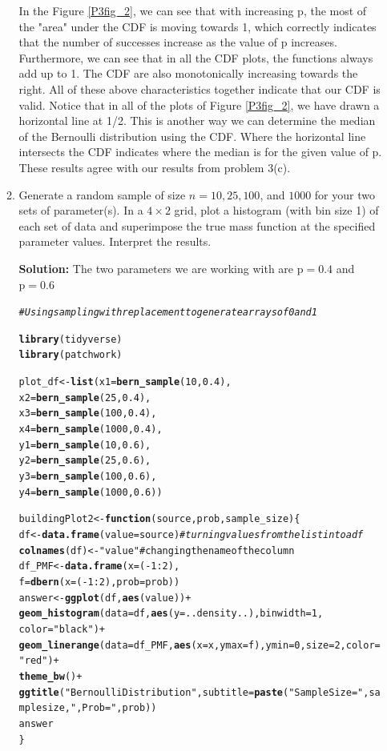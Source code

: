 \documentclass{article}\usepackage[]{graphicx}\usepackage[]{color}
\makeatletter
\newcommand{\hlstr}[1]{\textcolor[rgb]{0.192,0.494,0.8}{#1}}%
\newcommand{\hlcom}[1]{\textcolor[rgb]{0.678,0.584,0.686}{\textit{#1}}}%
\newcommand{\hlkwd}[1]{\textcolor[rgb]{0.737,0.353,0.396}{\textbf{#1}}}%
\newenvironment{kframe}{%
 \def\at@end@of@kframe{}%
 \ifinner\ifhmode%
  \def\at@end@of@kframe{\end{minipage}}%
  \begin{minipage}{\columnwidth}%
 \fi\fi%
 \def\FrameCommand##1{\hskip\@totalleftmargin \hskip-\fboxsep
 \colorbox{shadecolor}{##1}\hskip-\fboxsep
     \hskip-\linewidth \hskip-\@totalleftmargin \hskip\columnwidth}%
 \MakeFramed {\advance\hsize-\width
   \@totalleftmargin\z@ \linewidth\hsize
   \@setminipage}}%
 {\par\unskip\endMakeFramed%
 \at@end@of@kframe}
\newenvironment{knitrout}{}{} %
\makeatother
\begin{document}
\begin{enumerate}
\begin{enumerate}
In the Figure \ref{P3fig_2}, we can see that with increasing p, the most of the "area" under the CDF is moving towards 1, which correctly indicates that the number of successes increase as the value of p increases. Furthermore, we can see that in all the CDF plots, the functions always add up to 1. The CDF are also monotonically increasing towards the right. All of these above characteristics together indicate that our CDF is valid. Notice that in all of the plots of Figure \ref{P3fig_2}, we have drawn a horizontal line at 1/2. This is another way we can determine the median of the Bernoulli distribution using the CDF. Where the horizontal line intersects the CDF indicates where the median is for the given value of p. These results agree with our results from problem 3(c).
  \item Generate a random sample of size $n=10, 25, 100$, and $1000$ for your 
  two sets of parameter(s). In a $4 \times 2$ grid, plot a histogram (with bin 
  size 1) of each set of data and superimpose the true mass function at the 
  specified parameter values. Interpret the results.
  

  \textbf{Solution:} The two parameters we are working with are $\mathrm{p=0.4}$ and $\mathrm{p=0.6}$
\begin{knitrout}
\color{fgcolor}\begin{kframe}
\begin{alltt}
\hlcom{# Using sampling with replacement to generate arrays of 0 and 1}

\hlkwd{library}(tidyverse)
\hlkwd{library}(patchwork)

plot_df <- \hlkwd{list}( x1 = \hlkwd{bern_sample}(10, 0.4),
                 x2 = \hlkwd{bern_sample}(25, 0.4),
                 x3 = \hlkwd{bern_sample}(100, 0.4),
                 x4 = \hlkwd{bern_sample}(1000, 0.4),
                 y1 = \hlkwd{bern_sample}(10, 0.6),
                 y2 = \hlkwd{bern_sample}(25, 0.6),
                 y3 = \hlkwd{bern_sample}(100, 0.6),
                 y4 = \hlkwd{bern_sample}(1000, 0.6))

                 
buildingPlot2 <- \hlkwd{function}(source, prob, sample_size)\{
	  df <- \hlkwd{data.frame}(value=source) \hlcom{#turning values from the list into a df}
	  \hlkwd{colnames}(df) <- \hlstr{"value"} #changing the name of the column
	  df_PMF <- \hlkwd{data.frame}(x = (-1:2),
                      f = \hlkwd{dbern}(x = (-1:2), prob = prob))
	  answer<-\hlkwd{ggplot}(df, \hlkwd{aes}(value))+
	     \hlkwd{geom_histogram}(data = df, \hlkwd{aes}(y=..density..), binwidth=1,
	                 color=\hlstr{"black"})+
	  \hlkwd{geom_linerange}(data=df_PMF, \hlkwd{aes}(x=x, ymax = f), ymin = 0, size=2, color=\hlstr{"red"})+
	  \hlkwd{theme_bw}() +
	  \hlkwd{ggtitle}(\hlstr{"Bernoulli Distribution"},subtitle = \hlkwd{paste}(\hlstr{"Sample Size ="}, sample size, \hlstr{", Prob ="}, prob))
	  answer
	\}


\end{alltt}
\end{kframe}
\end{knitrout}
\end{enumerate}
\end{enumerate}
\end{document}
